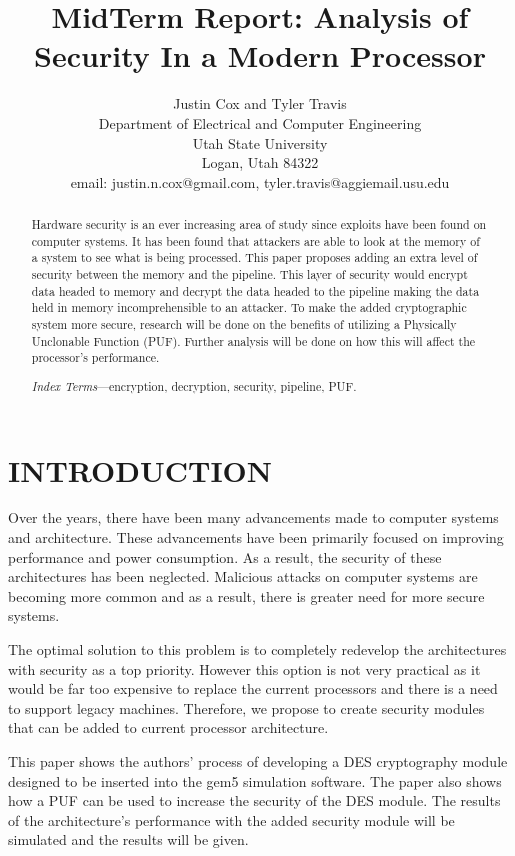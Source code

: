 \documentclass[letterpaper, 10 pt, conference]{ieeeconf}  %
\title{\LARGE \bf
MidTerm Report: Analysis of Security In a Modern Processor
}
\author{Justin Cox and Tyler Travis
\\ \small{Department of Electrical and Computer Engineering}
\\ \small{Utah State University}
\\ \small{Logan, Utah 84322}
\\ \small{email: justin.n.cox@gmail.com, tyler.travis@aggiemail.usu.edu}
}
\begin{document}
\maketitle
\thispagestyle{empty}
\pagestyle{empty}


\begin{abstract}

Hardware security is an ever increasing area of study since exploits have been found on computer systems. It has been found that attackers are able to look at the memory of a system to see what is being processed. This paper proposes adding an extra level of security between the memory and the pipeline. This layer of security would encrypt data headed to memory and decrypt the data headed to the pipeline making the data held in memory incomprehensible to an attacker. To make the added cryptographic system more secure, research will be done on the benefits of utilizing a Physically Unclonable Function (PUF). Further analysis will be done on how this will affect the processor's performance.

\emph{Index Terms}---encryption, decryption, security, pipeline, PUF.

\end{abstract}

\section{INTRODUCTION}

Over the years, there have been many advancements made to computer systems and architecture. These advancements have been primarily focused on improving performance and power consumption. As a result, the security of these architectures has been neglected. Malicious attacks on computer systems are becoming more common and as a result, there is greater need for more secure systems.

The optimal solution to this problem is to completely redevelop the architectures with security as a top priority. However this option is not very practical as it would be far too expensive to replace the current processors and there is a need to support legacy machines. Therefore, we propose to create security modules that can be added to current processor architecture.

This paper shows the authors' process of developing a DES cryptography module designed to be inserted into the gem5 simulation software.  The paper also shows how a PUF can be used to increase the security of the DES module.  The results of the architecture's performance with the added security module will be simulated and the results will be given. 
\end{document}
